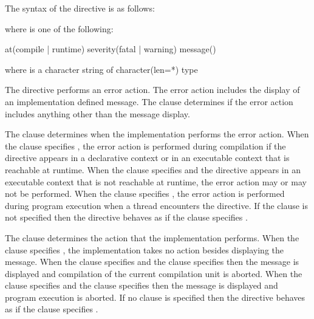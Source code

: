 \begin{fortranspecific}
\begin{samepage}
The syntax of the  directive is as follows:

\end{samepage}

\begin{samepage}
where  is one of the following{}:

\begin{indentedcodelist}
at(compile | runtime)
severity(fatal | warning)
message()
\end{indentedcodelist}

where  is a character string of character(len=*) type
\end{samepage}
\end{fortranspecific}

\descr

The  directive performs an error action. The error action
includes the display of an implementation defined message. The 
clause determines if the error action includes anything other than the
message display.

The  clause determines when the implementation performs the error 
action. When the  clause specifies , the error action 
is performed during compilation if the  directive appears in a 
declarative context or in an executable context that is reachable at
runtime. When the  clause specifies  and the 
 directive appears in an executable context that is not 
reachable at runtime, the error action may or may not be performed. When the 
 clause specifies , the error action is performed 
during program execution when a thread encounters the directive. If the 
 clause is not specified then the  directive behaves 
as if the  clause specifies .

The  clause determines the action that the implementation
performs. When the  clause specifies , the 
implementation takes no action besides displaying the message. When the 
 clause specifies  and the  clause 
specifies   then the message is displayed and compilation 
of the current compilation unit is aborted. When the  
clause specifies  and  the  clause specifies 
 then the message is displayed and program execution is 
aborted. If no  clause is specified then the  
directive behaves as if the  clause specifies .

